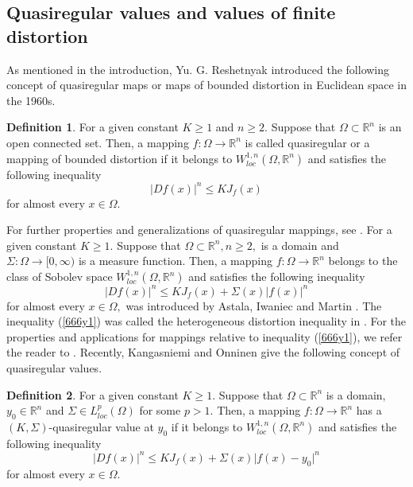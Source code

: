 \documentclass[11pt,twoside]{article}
\theoremstyle{definition}
\newtheorem{defn}{Definition}[section]
\theoremstyle{remark}
\begin{document}
\subsection{Quasiregular values and values of finite distortion}
  As mentioned in the introduction, Yu. G. Reshetnyak  \cite{Res67} introduced the following concept of quasiregular maps or maps of bounded distortion in Euclidean space in the 1960s. 
  \begin{defn}{\rm\cite{Res67}}\label{019001}
  For a given constant $K\geq1$ and $n\geq2.$ Suppose that $\Omega\subset\mathbb{R}^{n}$  is an open connected set. Then, a mapping $f:\Omega\rightarrow\mathbb{R}^{n}$ is called quasiregular or a mapping of bounded distortion if it belongs to $W_{loc}^{1,n}(\Omega, \mathbb{R}^{n})$ and satisfies the following inequality 
  $$\vert Df(x)\vert^{n}\leq KJ_{f}(x)$$
  for almost every $x\in\Omega.$
  \end{defn}
 For further properties and generalizations of quasiregular mappings, see \cite{Ric93,HK14, IM01, Guo15, GGWX25,GW16}. For a given constant $K\geq1.$ Suppose that $\Omega\subset\mathbb{R}^{n},n\geq2,$  is a domain  and $\Sigma:\Omega\rightarrow[0,\infty)$ is a  measure function. Then, a mapping $f:\Omega\rightarrow\mathbb{R}^{n}$ belongs to the class of Sobolev space $W_{loc}^{1,n}(\Omega, \mathbb{R}^{n})$ and satisfies the following inequality 
 \begin{equation}\label{666y1}
\vert Df(x)\vert^{n}\leq KJ_{f}(x)+\Sigma(x)\vert f(x)\vert^{n}
\end{equation}
  for almost every $x\in\Omega,$ was introduced by Astala, Iwaniec and Martin \cite[Section 8.5]{ATM09}. The inequality  (\ref{666y1}) was called the heterogeneous distortion inequality in \cite{KO221}.
For the properties and applications for mappings relative to inequality (\ref{666y1}), we refer the reader to \cite{Nir53,FS58,Har58,Sim77,AP06}.  Recently,  Kangasniemi and  Onninen \cite{KO222} give the following concept of quasiregular values.
 \begin{defn}\cite[Definition 1.1]{KO222} 
  For a given constant $K\geq1.$ Suppose that $\Omega\subset\mathbb{R}^{n}$  is a domain, $y_{0}\in\mathbb{R}^{n}$ and $\Sigma\in L_{loc}^{p}(\Omega)$ for some $p>1.$  Then, a mapping $f:\Omega\rightarrow\mathbb{R}^{n}$ has a $(K,\Sigma)$-quasiregular value at $y_{0}$ if it belongs to $W_{loc}^{1,n}(\Omega, \mathbb{R}^{n})$ and satisfies the following inequality
  \begin{equation}
  \vert Df(x)\vert^{n}\leq KJ_{f}(x)+\Sigma(x)\vert f(x)-y_{0}\vert^{n}
  \end{equation}
  for almost every $x\in\Omega.$
  \end{defn}
\end{document}
